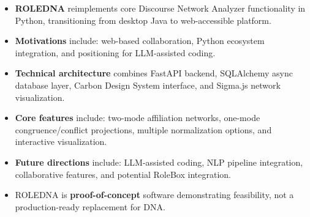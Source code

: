 \documentclass[../main.tex]{subfiles}
\begin{document}
\begin{summarybox}
\begin{itemize}[leftmargin=*, itemsep=0.3em]
\item \textbf{ROLEDNA} reimplements core Discourse Network Analyzer functionality in Python, transitioning from desktop Java to web-accessible platform.

\item \textbf{Motivations} include: web-based collaboration, Python ecosystem integration, and positioning for LLM-assisted coding.

\item \textbf{Technical architecture} combines FastAPI backend, SQLAlchemy async database layer, Carbon Design System interface, and Sigma.js network visualization.

\item \textbf{Core features} include: two-mode affiliation networks, one-mode congruence/conflict projections, multiple normalization options, and interactive visualization.

\item \textbf{Future directions} include: LLM-assisted coding, NLP pipeline integration, collaborative features, and potential RoleBox integration.

\item ROLEDNA is \textbf{proof-of-concept} software demonstrating feasibility, not a production-ready replacement for DNA.
\end{itemize}
\end{summarybox}
\end{document}
